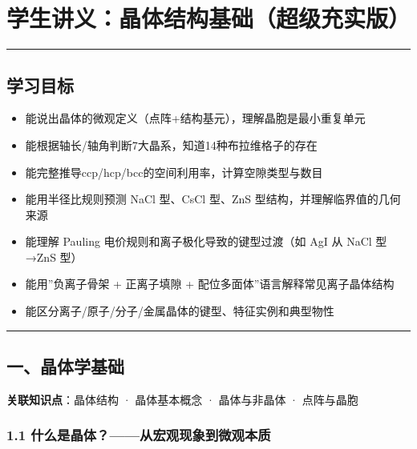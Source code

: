 \section{学生讲义：晶体结构基础（超级充实版）}\label{ux5b66ux751fux8bb2ux4e49ux6676ux4f53ux7ed3ux6784ux57faux7840ux8d85ux7ea7ux5145ux5b9eux7248}

\begin{center}\rule{0.5\linewidth}{0.5pt}\end{center}

\subsection{学习目标}\label{ux5b66ux4e60ux76eeux6807}

\begin{itemize}
\tightlist
\item
  能说出晶体的微观定义（点阵+结构基元），理解晶胞是最小重复单元
\item
  能根据轴长/轴角判断7大晶系，知道14种布拉维格子的存在
\item
  能完整推导ccp/hcp/bcc的空间利用率，计算空隙类型与数目
\item
  能用半径比规则预测 NaCl 型、CsCl 型、ZnS 型结构，并理解临界值的几何来源
\item
  能理解 Pauling 电价规则和离子极化导致的键型过渡（如 AgI 从 NaCl 型→ZnS 型）
\item
  能用''负离子骨架 + 正离子填隙 + 配位多面体''语言解释常见离子晶体结构
\item
  能区分离子/原子/分子/金属晶体的键型、特征实例和典型物性
\end{itemize}

\begin{center}\rule{0.5\linewidth}{0.5pt}\end{center}

\subsection{一、晶体学基础}\label{ux4e00ux6676ux4f53ux5b66ux57faux7840}

\textbf{关联知识点}：晶体结构 · 晶体基本概念 · 晶体与非晶体 · 点阵与晶胞

\subsubsection{1.1 什么是晶体？------从宏观现象到微观本质}\label{ux4ec0ux4e48ux662fux6676ux4f53ux4eceux5b8fux89c2ux73b0ux8c61ux5230ux5faeux89c2ux672cux8d28}

